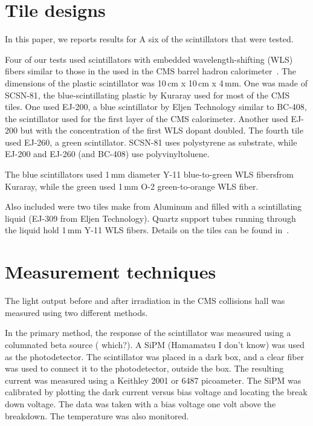 \documentclass[review]{elsarticle}
\begin{document}
\section{Tile designs}
\label{sec:design}

In this paper, we reports results for A six of the scintillators that were tested.

Four of our tests used scintillators with embedded wavelength-shifting (WLS) fibers similar to those in the used in the CMS barrel hadron calorimeter~\cite{CMSHB}.  The dimensions of the plastic scintillator was
10\,cm x 10\,cm x 4\,mm.
One was made of SCSN-81, the blue-scintillating plastic by Kuraray
used for most of the
CMS tiles.  One used EJ-200, a blue scintillator by
Eljen Technology similar to BC-408, the scintillator used for the
first layer of the CMS calorimeter.  Another used EJ-200 but with
the concentration of the first WLS dopant doubled.  The fourth
tile used EJ-260, a green scintillator.
SCSN-81 uses polystyrene as substrate, while EJ-200 and EJ-260
(and BC-408) use polyvinyltoluene.

The blue scintillators used 1\,mm diameter Y-11 blue-to-green
WLS fibersfrom Kuraray,
while the green used 1\,mm O-2 green-to-orange WLS fiber.

Also included were two tiles make from Aluminum and filled with a scintillating liquid (EJ-309 from Eljen Technology).
Quartz support tubes running through the liquid hold 1\,mm Y-11 WLS fibers.
Details on the tiles can be found in~\cite{mdliquidtile}.


\section{Measurement techniques}
\label{sec:techniques}

The light output before and after irradiation in the CMS collisions hall
was measured using two different methods.

In the primary method, the response
of the scintillator was measured 
using a columnated beta source ({\color{red} which?}).
A SiPM (Hamamatsu {\color{red} I don't know}) was used as the photodetector.
The scintillator was placed in a dark box, and a clear fiber was used
to connect it to the photodetector, outside the box.
The resulting current was measured using a Keithley 2001 or 6487 picoameter.
The SiPM was calibrated by plotting the dark current versus bias voltage and locating the break down voltage.  The data was taken with a bias voltage one volt above the breakdown.   The temperature was also monitored.
\end{document}
